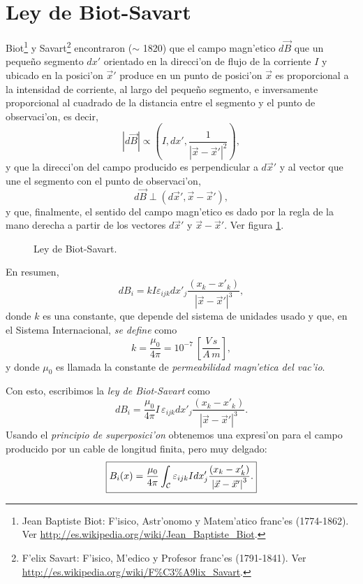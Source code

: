 \section{Ley de Biot-Savart}
Biot\footnote{Jean Baptiste Biot: F'isico, Astr'onomo y Matem'atico franc'es (1774-1862). Ver \url{http://es.wikipedia.org/wiki/Jean_Baptiste_Biot}.} y Savart\footnote{F'elix Savart: F'isico, M'edico y Profesor franc'es (1791-1841). Ver \url{http://es.wikipedia.org/wiki/F\%C3\%A9lix_Savart}.} encontraron ($\sim$ 1820) que el campo magn'etico $d\vec{B}$ que un peque\~no segmento $dx'$ orientado en la direcci'on de flujo de la corriente $I$ y ubicado en la posici'on $\vec{x}'$ produce en un punto de posici'on $\vec{x}$ es proporcional a la intensidad de corriente, al largo del
peque\~no segmento, e inversamente proporcional al cuadrado de la distancia
entre el segmento y el punto de observaci'on, es decir,
\begin{equation}
 \left\vert d\vec{B}\right\vert \propto
\left(I,dx',\frac{1}{\left|\vec{x}-\vec{x}'\right|^2}\right),
\end{equation}
y que la direcci'on del campo producido es perpendicular a $d\vec{x}'$ y al
vector que une el segmento con el punto de observaci'on,
\begin{equation}
d\vec{B}  \perp\left(  d\vec{x}', \vec{x}-\vec{x}' \right) ,
\end{equation}
y que, finalmente, el sentido del campo magn'etico es dado por la regla de la mano derecha a partir de los vectores $d\vec{x}'$ y $\vec{x}-\vec{x}'$. Ver figura \ref{fBS1}. 
\begin{figure}[!h]
\centerline{}
\label{Esquema para la ley de Biot-Savart.}
\label{fBS1}
\caption{Ley de Biot-Savart.}
\end{figure}
En resumen,
\begin{equation}
dB_i=kI\varepsilon_{ijk}dx'_j\frac{\left(x_k-x'_k\right)}{\left\vert
\vec{x}-\vec{x}'\right\vert^3},
\end{equation}
donde $k$ es una constante, que depende del sistema de unidades usado y que,
en el Sistema Internacional, \textit{se define} como
\begin{equation}
k=\frac{\mu_0}{4\pi}=10^{-7}~\left[  \frac{V\,s}{A\,m}\right],
\end{equation}
y donde $\mu_0$ es llamada la constante de \textit{permeabilidad magn'etica del vac'io}.

Con esto, escribimos la \textit{ley de Biot-Savart} como%
\begin{equation}
dB_i=\frac{\mu_0}{4\pi}I\,\varepsilon_{ijk}dx'_j\frac{\left(x_k-x'_k\right)}
{\left\vert \vec{x}-\vec{x}'\right\vert ^3}.
\end{equation}
Usando el \textit{principio de superposici'on} obtenemos una expresi'on para el campo producido por un cable de longitud finita, pero muy delgado:
\begin{equation}
\boxed{B_i(x)=\frac{\mu_0}{4\pi}\int_{\cal C}\varepsilon_{ijk}Idx'_j
\frac{\left(x_k-x'_k\right)}{\left\vert\vec{x}-\vec{x}'\right\vert^3}.}
\label{BS1}
\end{equation}

